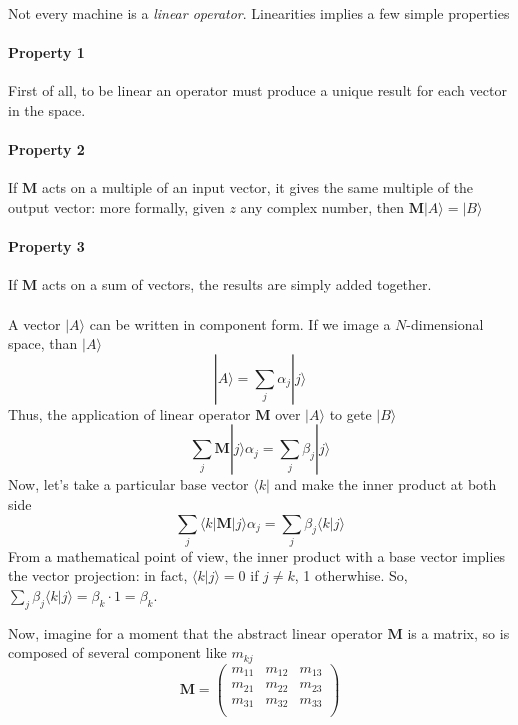 \documentclass[a4paper,10pt]{article}
\begin{document}
Not every machine is a \textit{linear operator}. Linearities implies a few simple properties

\paragraph{Property 1} First of all, to be linear an operator must produce a unique result for each vector in the space.

\paragraph{Property 2} If $\mathbf{M}$ acts on a multiple of an input vector, it gives the same multiple of the output vector: more formally, given $z$ any complex number, then $\mathbf{M}|A\rangle = |B\rangle$

\paragraph{Property 3} If $\mathbf{M}$ acts on a sum of vectors, the results are simply added together.

\paragraph{} A vector $|A\rangle$ can be written in component form. If we image a $N$-dimensional space, than $|A\rangle$
$$|A\rangle = \sum\limits_{j}\alpha_j|j\rangle$$
Thus, the application of linear operator $\mathbf{M}$ over $|A\rangle$ to gete $|B\rangle$
$$\sum\limits_{j}\mathbf{M}|j\rangle\alpha_j = \sum\limits_{j}\beta_j|j\rangle$$
Now, let's take a particular base vector $\langle k|$ and make the inner product at both side
$$\sum\limits_{j}\langle k|\mathbf{M}|j\rangle\alpha_j = \sum\limits_{j}\beta_j\langle k|j\rangle$$
From a mathematical point of view, the inner product with a base vector implies the vector projection: in fact, $\langle k|j\rangle = 0$ if $j \neq k$, 1 otherwhise. So, $\sum\limits_{j}\beta_j\langle k|j\rangle = \beta_k \cdot 1 = \beta_k$.

Now, imagine for a moment that the abstract linear operator $\mathbf{M}$ is a matrix, so is composed of several component like $m_{kj}$
$$\mathbf{M} = \left(\begin{matrix}
    m_{11} & m_{12} & m_{13} \\
    m_{21} & m_{22} & m_{23} \\
    m_{31} & m_{32} & m_{33} \\
\end{matrix}\right)$$
\end{document}
